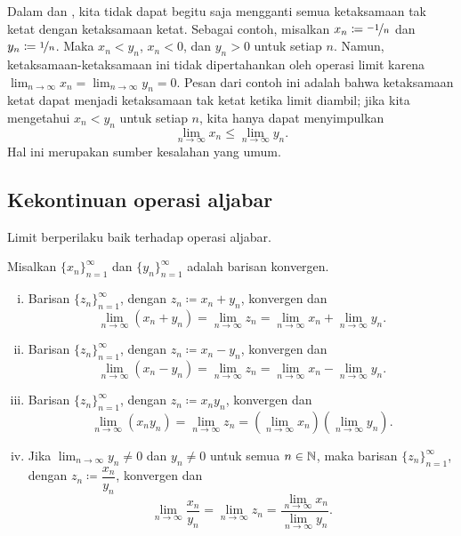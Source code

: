 Dalam  dan , kita tidak dapat begitu saja mengganti
semua ketaksamaan tak ketat dengan
ketaksamaan ketat.  Sebagai contoh,
misalkan $x_n \coloneqq \nicefrac{-1}{n}$ dan $y_n \coloneqq \nicefrac{1}{n}$.
Maka $x_n < y_n$, $x_n < 0$,
dan $y_n > 0$ untuk setiap $n$.  Namun, ketaksamaan-ketaksamaan ini
tidak dipertahankan oleh operasi limit karena
$\lim_{n\to\infty} x_n = \lim_{n\to\infty} y_n = 0$.
Pesan dari contoh ini adalah bahwa ketaksamaan ketat dapat menjadi ketaksamaan tak ketat
ketika limit diambil; jika kita mengetahui
$x_n < y_n$ untuk setiap $n$,
kita hanya dapat menyimpulkan 
\begin{equation*}
\lim_{n \to \infty} x_n \leq
\lim_{n \to \infty} y_n .
\end{equation*}
Hal ini merupakan sumber kesalahan yang umum.

\subsection{Kekontinuan operasi aljabar}

Limit berperilaku baik terhadap operasi aljabar.

\begin{prop} \label{prop:contalg}
Misalkan $\{ x_n \}_{n=1}^\infty$ dan $\{ y_n \}_{n=1}^\infty$ adalah barisan konvergen.
\begin{enumerate}[(i)]
\item \label{prop:contalg:i}
Barisan $\{ z_n \}_{n=1}^\infty$, dengan $z_n \coloneqq x_n + y_n$, konvergen dan
\begin{equation*}
\lim_{n \to \infty} (x_n + y_n) = 
\lim_{n \to \infty} z_n = 
\lim_{n \to \infty} x_n + 
\lim_{n \to \infty} y_n .
\end{equation*}
\item \label{prop:contalg:ii}
Barisan $\{ z_n \}_{n=1}^\infty$, dengan $z_n \coloneqq x_n - y_n$, konvergen dan
\begin{equation*}
\lim_{n \to \infty} (x_n - y_n) = 
\lim_{n \to \infty} z_n = 
\lim_{n \to \infty} x_n - 
\lim_{n \to \infty} y_n .
\end{equation*}
\item \label{prop:contalg:iii}
Barisan $\{ z_n \}_{n=1}^\infty$, dengan $z_n \coloneqq x_n y_n$, konvergen dan
\begin{equation*}
\lim_{n \to \infty} (x_n y_n) = 
\lim_{n \to \infty} z_n = 
\left( \lim_{n \to \infty} x_n \right)
\left( \lim_{n \to \infty} y_n \right) .
\end{equation*}
\item \label{prop:contalg:iv}
Jika $\lim_{n\to\infty} y_n \neq 0$ dan $y_n \neq 0$ untuk semua $n \in {\mathbb{N}}$, maka
barisan $\{ z_n \}_{n=1}^\infty$, dengan $z_n \coloneqq \dfrac{x_n}{y_n}$, konvergen dan
\begin{equation*}
\lim_{n \to \infty} \frac{x_n}{y_n} = 
\lim_{n \to \infty} z_n = 
\frac{\lim_{n \to \infty} x_n}{\lim_{n \to \infty} y_n} .
\end{equation*}
\end{enumerate}
\end{prop}

